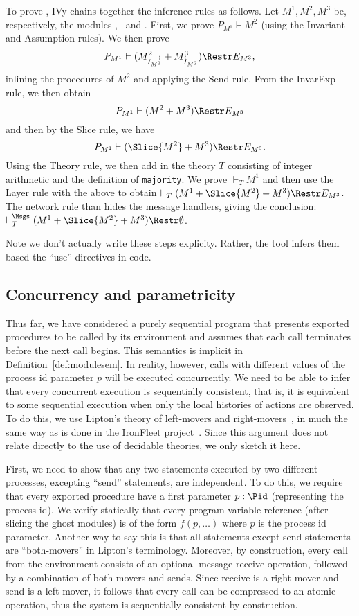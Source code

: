 To prove \Toy, IVy chains together the inference rules as follows. Let $M^1,
M^2,M^3$ be, respectively, the modules \mnodeset, \mtoyprotocol\ and \mtoysystem. First, we
prove $P_{M^1} \vdash M^2$ (using the Invariant and Assumption rules). We then prove
\[P_{M^1} \vdash (M^2_{\overrightarrow{I_{M^2}}} +
M^3_{\overleftarrow{I_{M^2}}}) \Restr E_{M^3},\]
inlining the procedures of $M^2$ and applying the Send rule. From the InvarExp
rule, we then obtain \[P_{M^1} \vdash (M^2 + M^3) \Restr
E_{M^3}\] and then by the Slice rule, we have \[P_{M^1} \vdash (\Slice{M^2} + M^3) \Restr
E_{M^3}.\] Using the Theory rule, we then add in the theory $T$
consisting of integer arithmetic and the definition of
\texttt{majority}. We prove $\vdash_T M^1$ and then use the Layer rule
with the above to obtain $\vdash_T (M^1 + \Slice{M^2} + M^3) \Restr
E_{M^3}$. The network rule than hides the message handlers, giving the conclusion:
$\vdash^{\Msgs}_T (M^1 + \Slice{M^2} + M^3) \Restr \emptyset$.

Note we don't actually write these steps explicity. Rather, the tool
infers them based the ``use'' directives in code.

\subsection{Concurrency and parametricity}

Thus far, we have considered a purely sequential program that presents
exported procedures to be called by its environment and assumes that
each call terminates before the next call begins.  This semantics is
implicit in Definition~\ref{def:modulesem}. In reality, however, calls
with different values of the process id parameter $p$ will be executed
concurrently. We need to be able to infer that every concurrent
execution is sequentially consistent, that is, it is equivalent to some
sequential execution when only the local histories of actions are
observed. To do this, we use Lipton's theory of left-movers and
right-movers~\cite{Lipton}, in much the same way as is done in the
IronFleet project~\cite{IronFleet}.  Since this argument does not relate
directly to the use of decidable theories, we only sketch it here.

First, we need to show that any two statements executed by two
different processes, excepting ``send'' statements, are independent.
To do this, we require that every exported procedure have a first
parameter $p:\Pid$ (representing the process id). We verify statically
that every program variable reference (after slicing the ghost
modules) is of the form $f(p,\ldots)$ where $p$ is the process id
parameter. Another way to say this is that all statements except send
statements are ``both-movers'' in Lipton's terminology. Moreover, by
construction, every call from the environment consists of an optional
message receive operation, followed by a combination of both-movers
and sends. Since receive is a right-mover and send is a left-mover, it
follows that every call can be compressed to an atomic operation, thus
the system is sequentially consistent by construction.

